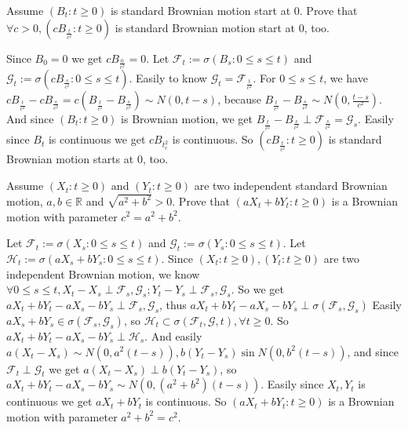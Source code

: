 \documentclass{ctexart}
\begin{document}
\begin{problem}\label{pro:2}
  Assume \((B_t:t \geq 0)\) is standard Brownian motion start at \(0\).
  Prove that \(\forall c>0,(c B_{\frac{t}{c^2}}:t \geq 0)\) is standard Brownian motion start at \(0\), too.
\end{problem}
\begin{solution}
  Since \(B_0=0\) we get \(c B_{\frac{0}{c^2}}=0\).
  Let \(\mathcal{F}_t:=\sigma(B_s:0 \leq s \leq t)\) and \(\mathcal{G}_t:=\sigma(c B_{\frac{s}{c^2}}:0 \leq s \leq t)\).
  Easily to know \(\mathcal{G}_t=\mathcal{F}_{\frac{t}{c^2}}\).
  For \(0 \leq s \leq t\), we have \(c B_{\frac{t}{c^2}}-c B_{\frac{s}{c^2}}= c(B_{\frac{t}{c^2}}-B_{\frac{s}{c^2}}) \sim N(0,t-s)\),
  because \(B_{\frac{t}{c^2}}-B_{\frac{s}{c^2}} \sim N(0,\frac{t-s}{c^2})\).
  And since \((B_t:t \geq 0)\) is Brownian motion, we get \(B_{\frac{t}{c^2}}-B_{\frac{s}{c^2}} \perp \mathcal{F}_{\frac{s}{c^2}}=\mathcal{G}_s\).
  Easily since \(B_t\) is continuous we get \(c B_{t_c^2}\) is continuous.
  So \((c B_{\frac{t}{c^2}}:t \geq 0)\) is standard Brownian motion starts at \(0\), too.
\end{solution}
\begin{problem}\label{pro:3}
  Assume \((X_t:t \geq 0)\) and \((Y_t:t \geq 0)\) are two independent standard Brownian motion, \(a,b \in \mathbb{R}\) and \(\sqrt{a^2 + b^2} >0\).
  Prove that \((aX_t + bY_t:t \geq 0)\) is a Brownian motion with parameter \(c^2=a^2 + b^2\).
\end{problem}
\begin{solution}
  Let \(\mathcal{F}_t:=\sigma(X_s:0 \leq s \leq t)\) and \(\mathcal{G}_t:=\sigma(Y_s:0 \leq s \leq t)\).
  Let \(\mathcal{H}_t:=\sigma(a X_s + b Y_s:0 \leq s \leq t)\).
  Since \((X_t:t \geq 0),(Y_t:t \geq 0)\) are two independent Brownian motion, we know \(\forall 0 \leq s \leq t,X_t - X_s \perp \mathcal{F}_s,\mathcal{G}_s;Y_t-Y_s \perp \mathcal{F}_s,\mathcal{G}_s\).
  So we get \(aX_t+bY_t-aX_s-bY_s \perp \mathcal{F}_s,\mathcal{G}_s\), thus \(aX_t+bY_t-aX_s-bY_s \perp \sigma(\mathcal{F}_s,\mathcal{G}_s)\)
  Easily \(a X_s+bY_s \in \sigma(\mathcal{F}_s,\mathcal{G}_s)\), so \(\mathcal{H}_t \subset \sigma(\mathcal{F}_t,\mathcal{G},t),\forall t \geq 0\).
  So \(a X_t+bY_t-aX_s-bY_s \perp \mathcal{H}_s\).
  And easily \(a(X_t-X_s) \sim N(0,a^2(t-s)),b(Y_t-Y_s) \sin N(0,b^2(t-s))\), and since \(\mathcal{F}_t \perp \mathcal{G}_t\) we get \(a(X_t-X_s) \perp b(Y_t-Y_s)\),
  so \(a X_t+bY_t-aX_s-bY_s \sim N(0,(a^2 + b^2)(t-s))\).
  Easily since \(X_t,Y_t\) is continuous we get \(a X_t + b Y_t\) is continuous.
  So \((a X_t + b Y_t:t \geq 0)\) is a Brownian motion with parameter \(a^2 + b^2 = c^2\).
\end{solution}
\end{document}
